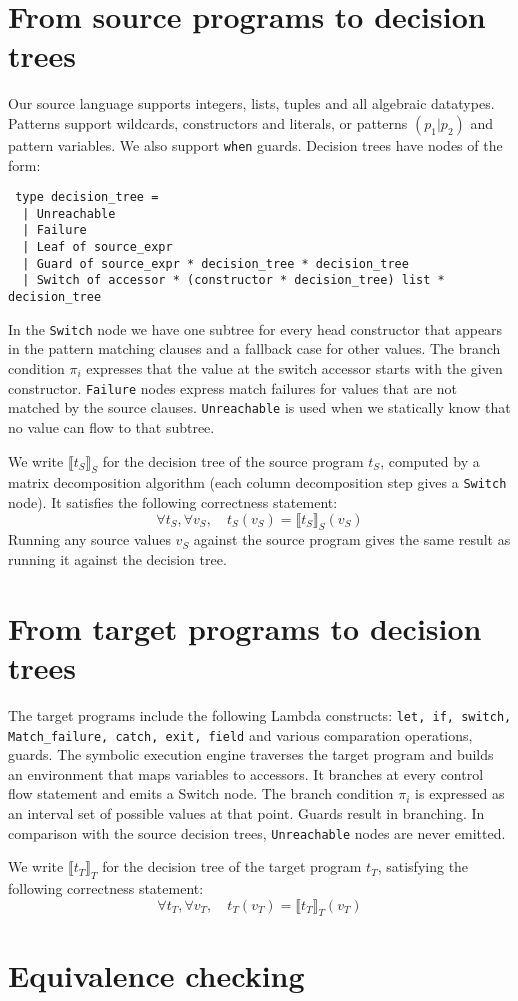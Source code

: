 \documentclass[12pt]{article}
\newcommand{\sem}[1]{{\llbracket{#1}\rrbracket}}
\begin{document}
\section{From source programs to decision trees}
Our source language supports integers, lists, tuples and all algebraic
datatypes. Patterns support wildcards, constructors and literals, or
patterns $(p_1|p_2)$ and pattern variables.
We also support \texttt{when} guards.
Decision trees have nodes of the form:
\begin{lstlisting}
 type decision_tree =
  | Unreachable
  | Failure
  | Leaf of source_expr
  | Guard of source_expr * decision_tree * decision_tree
  | Switch of accessor * (constructor * decision_tree) list * decision_tree
\end{lstlisting}
In the \texttt{Switch} node we have one subtree for every head constructor
that appears in the pattern matching clauses and a fallback case for
other values. The branch condition $\pi_i$ expresses that the value at the
switch accessor starts with the given constructor.
\texttt{Failure} nodes express match failures for values that are not
matched by the source clauses.
\texttt{Unreachable} is used when we statically know that no value
can flow to that subtree.

We write $\sem{t_S}_S$ for the decision tree of the source program
$t_S$, computed by a matrix decomposition algorithm (each column
decomposition step gives a \texttt{Switch} node).
It satisfies the following correctness statement:
\[
\forall t_S, \forall v_S, \quad t_S(v_S) = \sem{t_S}_S(v_S)
\]
Running any source values $v_S$ against the source program gives the
same result as running it against the decision tree.

\section{From target programs to decision trees}
The target programs include the following Lambda constructs:
\texttt{let, if, switch, Match\_failure, catch, exit, field} and
various comparation operations, guards. The symbolic execution engine
traverses the target program and builds an environment that maps
variables to accessors. It branches at every control flow statement
and emits a Switch node. The branch condition $\pi_i$ is expressed as
an interval set of possible values at that point.
Guards result in branching. In comparison with the source decision
trees, \texttt{Unreachable} nodes are never emitted.

We write $\sem{t_T}_T$ for the decision tree of the target program
$t_T$, satisfying the following correctness statement:
\[
\forall t_T, \forall v_T, \quad t_T(v_T) = \sem{t_T}_T(v_T)
\]

\section{Equivalence checking}
\end{document}
